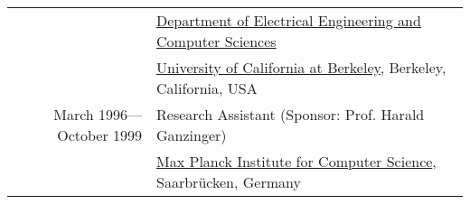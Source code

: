 \begin{tabular}{rl}
                           & \href{http://www.eecs.berkeley.edu}{Department of Electrical Engineering and Computer Sciences} \\
                           & \href{http://www.berkeley.edu}{University of California at Berkeley}, Berkeley, California, USA \\
\noalign{\smallskip}
March 1996---October 1999 & Research Assistant (Sponsor: Prof. Harald Ganzinger)\\
                          & \href{http://www.mpi-sb.mpg.de}{Max Planck Institute for Computer Science}, Saarbr{\"u}cken, Germany \\
\end{tabular}

\newpage
